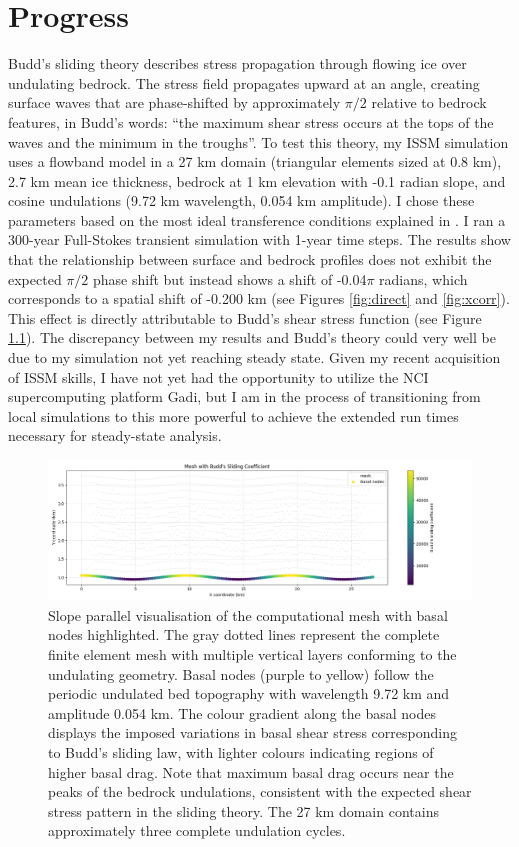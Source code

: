 \chapter{Progress}

Budd's sliding theory describes stress propagation through flowing ice over undulating bedrock. The stress field propagates upward at an angle, creating surface waves that are phase-shifted by approximately $\pi/2$ relative to bedrock features, in Budd's words: ``the maximum shear stress occurs at the tops of the waves and the minimum in the troughs''\cite{Budd_1970}. To test this theory, my ISSM simulation uses a flowband model in a 27 km domain (triangular elements sized at 0.8 km), 2.7 km mean ice thickness, bedrock at 1 km elevation with -0.1 radian slope, and cosine undulations (9.72 km wavelength, 0.054 km amplitude). I chose these parameters based on the most ideal transference conditions explained in \cite{Budd_1970}. I ran a 300-year Full-Stokes transient simulation with 1-year time steps. The results show that the relationship between surface and bedrock profiles does not exhibit the expected $\pi/2$ phase shift but instead shows a shift of -0.04$\pi$ radians, which corresponds to a spatial shift of -0.200 km (see Figures \ref{fig:direct} and \ref{fig:xcorr}). This effect is directly attributable to Budd's shear stress function (see Figure \ref{fig:friction}). The discrepancy between my results and Budd's theory could very well be due to my simulation not yet reaching steady state. Given my recent acquisition of ISSM skills, I have not yet had the opportunity to utilize the NCI supercomputing platform Gadi, but I am in the process of transitioning from local simulations to this more powerful to achieve the extended run times necessary for steady-state analysis.

\begin{figure}[H]
    \includegraphics[scale=0.5]{basal_friction.png}
    \caption{Slope parallel visualisation of the computational mesh with basal nodes highlighted. The gray dotted lines represent the complete finite element mesh with multiple vertical layers conforming to the undulating geometry. Basal nodes (purple to yellow) follow the periodic undulated bed topography with wavelength 9.72 km and amplitude 0.054 km. The colour gradient along the basal nodes displays the imposed variations in basal shear stress corresponding to Budd's sliding law, with lighter colours indicating regions of higher basal drag. Note that maximum basal drag occurs near the peaks of the bedrock undulations, consistent with the expected shear stress pattern in the sliding theory. The 27 km domain contains approximately three complete undulation cycles.}
    \label{fig:friction}
\end{figure}

